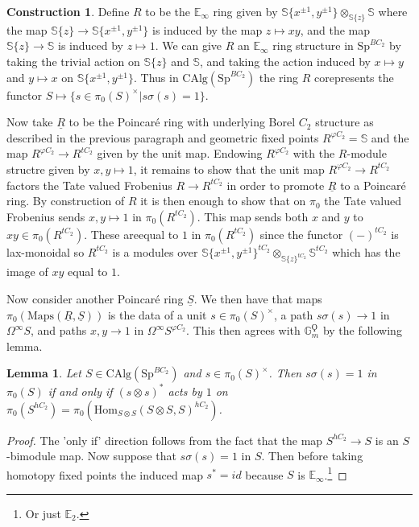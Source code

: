 \documentclass{article}
\renewcommand{\phi}{\varphi}
\newtheorem{lemma}[theorem]{Lemma}
\theoremstyle{definition}
\newtheorem{construction}[theorem]{Construction}
\begin{document}
\begin{construction}
Define $R$ to be the $\mathbb{E}_\infty$ ring given by $\mathbb{S}\{x^{\pm 1}, y^{\pm 1}\}\otimes_{\mathbb{S}\{z\}}\mathbb{S}$ where the map $\mathbb{S}\{z\}\to \mathbb{S}\{x^{\pm 1}, y^{\pm 1}\}$ is induced by the map $z\mapsto xy$, and the map $\mathbb{S}\{z\}\to \mathbb{S}$ is induced by $z\mapsto 1$. We can give $R$ an $\mathbb{E}_\infty$ ring structure in $\mathrm{Sp}^{BC_2}$ by taking the trivial action on $\mathbb{S}\{z\}$ and $\mathbb{S}$, and taking the action induced by $x\mapsto y$ and $y\mapsto x$ on $\mathbb{S}\{x^{\pm 1}, y^{\pm 1}\}$. Thus in $\mathrm{CAlg}(\mathrm{Sp}^{BC_2})$ the ring $R$ corepresents the functor $S\mapsto \{s\in \pi_0(S)^\times| s\sigma(s)=1\}$.

Now take $\underline{R}$ to be the Poincar{\'e} ring with underlying Borel $C_2$ structure as described in the previous paragraph and geometric fixed points $R^{\phi C_2}=\mathbb{S}$ and the map $R^{\phi C_2}\to R^{tC_2}$ given by the unit map. Endowing $R^{\phi C_2}$ with the $R$-module structre given by $x,y\mapsto 1$, it remains to show that the unit map $R^{\phi C_2}\to R^{tC_2}$ factors the Tate valued Frobenius $R\to R^{tC_2}$ in order to promote $\underline{R}$ to a Poincar{\'e} ring. By construction of $R$ it is then enough to show that on $\pi_0$ the Tate valued Frobenius sends $x,y\mapsto 1$ in $\pi_0(R^{tC_2})$. This map sends both $x$ and $y$ to $xy\in \pi_0(R^{tC_2})$. These areequal to $1$ in $\pi_0(R^{tC_2})$ since the functor $(-)^{tC_2}$ is lax-monoidal so $R^{tC_2}$ is a modules over $\mathbb{S}\{x^{\pm 1}, y^{\pm 1}\}^{tC_2}\otimes_{\mathbb{S}\{z\}^{tC_2}}\mathbb{S}^{tC_2}$ which has the image of $xy$ equal to $1$. 
\end{construction}

Now consider another Poincar{\'e} ring $\underline{S}$. We then have that maps $\pi_0(\mathrm{Maps}(\underline{R},\underline{S}))$ is the data of a unit $s\in \pi_0(S)^\times$, a path $s\sigma(s)\to 1$ in $\Omega^\infty S$, and paths $x,y\to 1$ in $\Omega^\infty S^{\phi C_2}$.  This then agrees with $\mathbb{G}_m^\Qoppa$ by the following lemma.

\begin{lemma}
Let $S\in \mathrm{CAlg}(\mathrm{Sp}^{BC_2})$ and $s\in \pi_0(S)^\times$. Then $s\sigma(s)=1$ in $\pi_0(S)$ if and only if $(s\otimes s)^*$ acts by $1$ on $\pi_0(S^{hC_2})=\pi_0(\mathrm{Hom}_{S\otimes S}(S\otimes S, S)^{hC_2})$.
\end{lemma}
\begin{proof}
The 'only if' direction follows from the fact that the map $S^{hC_2}\to S$ is an $S$-bimodule map. Now suppose that $s\sigma(s)=1$ in  $S$. Then before taking homotopy fixed points the induced map $s^*=id$ because $S$ is $\mathbb{E}_\infty$.\footnote{Or just $\mathbb{E}_2$.} 
\end{proof}
\end{document}
